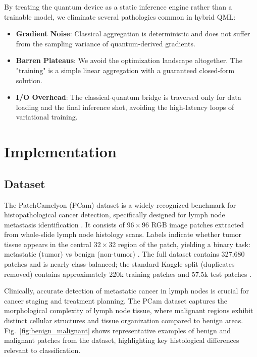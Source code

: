\documentclass[conference]{IEEEtran}
\begin{document}
By treating the quantum device as a static inference engine rather than a trainable model, we eliminate several pathologies common in hybrid QML:
\begin{itemize}
    \item \textbf{Gradient Noise}: Classical aggregation is deterministic and does not suffer from the sampling variance of quantum-derived gradients.
    \item \textbf{Barren Plateaus}: We avoid the optimization landscape altogether. The "training" is a simple linear aggregation with a guaranteed closed-form solution.
    \item \textbf{I/O Overhead}: The classical-quantum bridge is traversed only for data loading and the final inference shot, avoiding the high-latency loops of variational training.
\end{itemize}

\section{Implementation}

\subsection{Dataset}
The PatchCamelyon (PCam) dataset is a widely recognized benchmark for histopathological cancer detection, specifically designed for lymph node metastasis identification \cite{pcam_veeling2018,pcam_01,pcam_03}. It consists of 96\,$\times$\,96 RGB image patches extracted from whole-slide lymph node histology scans. Labels indicate whether tumor tissue appears in the central 32\,$\times$\,32 region of the patch, yielding a binary task: metastatic (tumor) vs benign (non-tumor) \cite{pcam_veeling2018}. The full dataset contains 327{,}680 patches and is nearly class-balanced; the standard Kaggle split (duplicates removed) contains approximately 220k training patches and 57.5k test patches \cite{pcam_veeling2018,pcam_03}.

Clinically, accurate detection of metastatic cancer in lymph nodes is crucial for cancer staging and treatment planning. The PCam dataset captures the morphological complexity of lymph node tissue, where malignant regions exhibit distinct cellular structures and tissue organization compared to benign areas. Fig.~\ref{fig:benign_malignant} shows representative examples of benign and malignant patches from the dataset, highlighting key histological differences relevant to classification.
\end{document}
